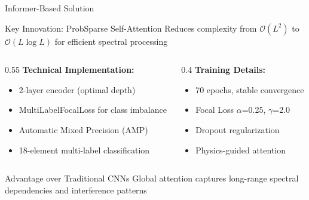 \documentclass{beamer}
\begin{document}
\begin{frame}{Informer-Based Solution}
  \begin{block}{Key Innovation: ProbSparse Self-Attention}
    Reduces complexity from $\mathcal{O}(L^2)$ to $\mathcal{O}(L \log L)$ for efficient spectral processing
  \end{block}
  
  \vspace{0.5em}
  
  \begin{columns}[T]
    \begin{column}{0.55\textwidth}
      \textbf{Technical Implementation:}
      \begin{itemize}
        \item 2-layer encoder (optimal depth)
        \item MultiLabelFocalLoss for class imbalance
        \item Automatic Mixed Precision (AMP)
        \item 18-element multi-label classification
      \end{itemize}
    \end{column}
    \begin{column}{0.4\textwidth}
      \textbf{Training Details:}
      \begin{itemize}
        \item 70 epochs, stable convergence
        \item Focal Loss $\alpha$=0.25, $\gamma$=2.0
        \item Dropout regularization
        \item Physics-guided attention
      \end{itemize}
    \end{column}
  \end{columns}
  
  \vspace{0.5em}
  \begin{exampleblock}{Advantage over Traditional CNNs}
    Global attention captures long-range spectral dependencies and interference patterns
  \end{exampleblock}
\end{frame}
\end{document}
